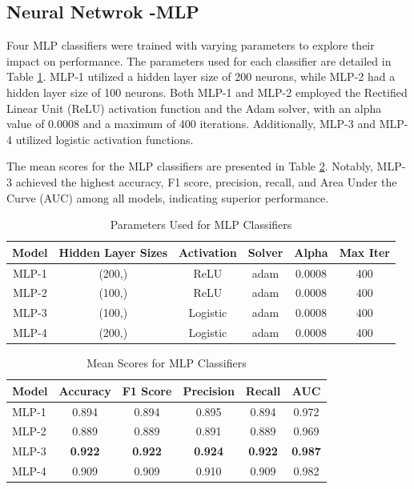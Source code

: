 \subsection*{Neural Netwrok -MLP}
Four MLP classifiers were trained with varying parameters to explore their impact on performance. The parameters used for each classifier are detailed in Table \ref{tab:mlp_params}. MLP-1 utilized a hidden layer size of 200 neurons, while MLP-2 had a hidden layer size of 100 neurons. Both MLP-1 and MLP-2 employed the Rectified Linear Unit (ReLU) activation function and the Adam solver, with an alpha value of 0.0008 and a maximum of 400 iterations. Additionally, MLP-3 and MLP-4 utilized logistic activation functions.

The mean scores for the MLP classifiers are presented in Table \ref{tab:mlp_scores}. Notably, MLP-3 achieved the highest accuracy, F1 score, precision, recall, and Area Under the Curve (AUC) among all models, indicating superior performance.

\begin{table}[hhtbp]
    \centering
    \begin{tabular}{|c|c|c|c|c|c|}
    \hline
    \textbf{Model} & \textbf{Hidden Layer Sizes} & \textbf{Activation} & \textbf{Solver} & \textbf{Alpha} & \textbf{Max Iter}  \\
    \hline
    MLP-1 & (200,) & ReLU & adam & 0.0008 & 400  \\
    MLP-2 & (100,) & ReLU & adam & 0.0008 & 400  \\
    MLP-3 & (100,) & Logistic & adam & 0.0008 & 400  \\
    MLP-4 & (200,) & Logistic & adam & 0.0008 & 400  \\
    \hline
    \end{tabular}
    \caption{Parameters Used for MLP Classifiers}
    \label{tab:mlp_params}
    \end{table}
    
    \begin{table}[hhtbp]
    \centering
    \begin{tabular}{|l|c|c|c|c|c|}
    \hline
    \textbf{Model} & \textbf{Accuracy} & \textbf{F1 Score} & \textbf{Precision} & \textbf{Recall} & \textbf{AUC} \\
    \hline
    MLP-1 & 0.894 & 0.894 & 0.895 & 0.894 & 0.972 \\
    MLP-2 & 0.889 & 0.889 & 0.891 & 0.889 & 0.969 \\
    MLP-3 & \textbf{0.922} & \textbf{0.922} & \textbf{0.924} & \textbf{0.922} & \textbf{0.987} \\
    MLP-4 & 0.909 & 0.909 & 0.910 & 0.909 & 0.982 \\
    
    \hline
    \end{tabular}
    \caption{Mean Scores for MLP Classifiers}
    \label{tab:mlp_scores}
    \end{table}
    
